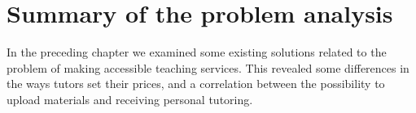 \section{Summary of the problem analysis}
In the preceding chapter we examined some existing solutions related to the problem of making accessible teaching services.
This revealed some differences in the ways tutors set their prices, and a correlation between the possibility to upload materials and receiving personal tutoring. 
